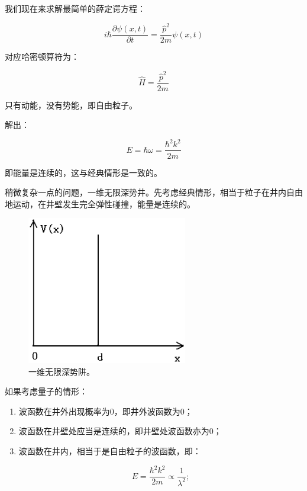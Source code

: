 我们现在来求解最简单的薛定谔方程：

\begin{equation}
i \hbar \frac{\partial \psi(x,t)}{\partial t} = \frac{\hat p^2}{2m}
\psi(x,t)
\end{equation}

对应哈密顿算符为：

\begin{equation}
\hat H = \frac{\hat p^2}{2m}
\end{equation}

只有动能，没有势能，即自由粒子。

解出：

\begin{equation}
E =\hbar \omega= \frac{\hbar^2 k^2}{2m}
\end{equation}

即能量是连续的，这与经典情形是一致的。

稍微复杂一点的问题，一维无限深势井。先考虑经典情形，相当于粒子在井内自由地运动，在井壁发生完全弹性碰撞，能量是连续的。

\begin{figure}[htbp]
\begin{center}
\includegraphics[width=7cm]{QuantumIntro/infinite_well.ps}
\caption{一维无限深势阱。}
\end{center}
\end{figure}

如果考虑量子的情形：

\begin{enumerate}
\item 

波函数在井外出现概率为0，即井外波函数为0；

\item

波函数在井壁处应当是连续的，即井壁处波函数亦为0；

\item

波函数在井内，相当于是自由粒子的波函数，即：

\begin{equation}
E=\frac{\hbar^2 k^2}{2m} \propto \frac{1}{\lambda^2} ;
\end{equation}

\end{enumerate}

